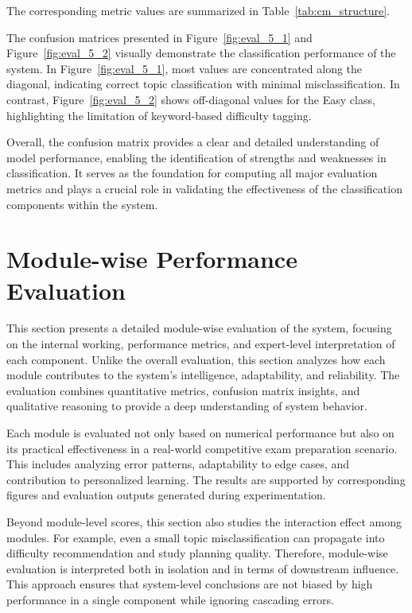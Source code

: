 \begin{sloppypar}
The corresponding metric values are summarized in Table~\ref{tab:cm_structure}.

The confusion matrices presented in Figure~\ref{fig:eval_5_1} and Figure~\ref{fig:eval_5_2} visually demonstrate the classification performance of the system. In Figure~\ref{fig:eval_5_1}, most values are concentrated along the diagonal, indicating correct topic classification with minimal misclassification. In contrast, Figure~\ref{fig:eval_5_2} shows off-diagonal values for the Easy class, highlighting the limitation of keyword-based difficulty tagging.

Overall, the confusion matrix provides a clear and detailed understanding of model performance, enabling the identification of strengths and weaknesses in classification. It serves as the foundation for computing all major evaluation metrics and plays a crucial role in validating the effectiveness of the classification components within the system.

\section{Module-wise Performance Evaluation}

This section presents a detailed module-wise evaluation of the system, focusing on the internal working, performance metrics, and expert-level interpretation of each component. Unlike the overall evaluation, this section analyzes how each module contributes to the system's intelligence, adaptability, and reliability. The evaluation combines quantitative metrics, confusion matrix insights, and qualitative reasoning to provide a deep understanding of system behavior.

Each module is evaluated not only based on numerical performance but also on its practical effectiveness in a real-world competitive exam preparation scenario. This includes analyzing error patterns, adaptability to edge cases, and contribution to personalized learning. The results are supported by corresponding figures and evaluation outputs generated during experimentation.

Beyond module-level scores, this section also studies the interaction effect among modules. For example, even a small topic misclassification can propagate into difficulty recommendation and study planning quality. Therefore, module-wise evaluation is interpreted both in isolation and in terms of downstream influence. This approach ensures that system-level conclusions are not biased by high performance in a single component while ignoring cascading errors.


\end{sloppypar}
